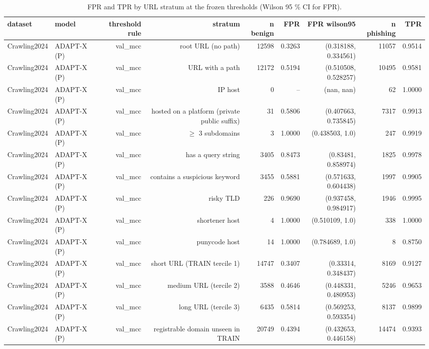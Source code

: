 \begin{table}[t]
\centering
\scriptsize
\caption{FPR and TPR by URL stratum at the frozen thresholds (Wilson 95 \% CI for FPR).}
\label{tab:rev_R7_fpr_tpr_by_url_stratum}
\begin{tabular}{llrrrrrrr}
\toprule
dataset & model & threshold rule & stratum & n benign & FPR & FPR wilson95 & n phishing & TPR \\
\midrule
Crawling2024 & ADAPT-X (P) & val\_mcc & root URL (no path) & 12598 & 0.3263 & (0.318188, 0.334561) & 11057 & 0.9514 \\
Crawling2024 & ADAPT-X (P) & val\_mcc & URL with a path & 12172 & 0.5194 & (0.510508, 0.528257) & 10495 & 0.9581 \\
Crawling2024 & ADAPT-X (P) & val\_mcc & IP host & 0 & -- & (nan, nan) & 62 & 1.0000 \\
Crawling2024 & ADAPT-X (P) & val\_mcc & hosted on a platform (private public suffix) & 31 & 0.5806 & (0.407663, 0.735845) & 7317 & 0.9913 \\
Crawling2024 & ADAPT-X (P) & val\_mcc & $\geq$ 3 subdomains & 3 & 1.0000 & (0.438503, 1.0) & 247 & 0.9919 \\
Crawling2024 & ADAPT-X (P) & val\_mcc & has a query string & 3405 & 0.8473 & (0.83481, 0.858974) & 1825 & 0.9978 \\
Crawling2024 & ADAPT-X (P) & val\_mcc & contains a suspicious keyword & 3455 & 0.5881 & (0.571633, 0.604438) & 1997 & 0.9905 \\
Crawling2024 & ADAPT-X (P) & val\_mcc & risky TLD & 226 & 0.9690 & (0.937458, 0.984917) & 1946 & 0.9995 \\
Crawling2024 & ADAPT-X (P) & val\_mcc & shortener host & 4 & 1.0000 & (0.510109, 1.0) & 338 & 1.0000 \\
Crawling2024 & ADAPT-X (P) & val\_mcc & punycode host & 14 & 1.0000 & (0.784689, 1.0) & 8 & 0.8750 \\
Crawling2024 & ADAPT-X (P) & val\_mcc & short URL (TRAIN tercile 1) & 14747 & 0.3407 & (0.33314, 0.348437) & 8169 & 0.9127 \\
Crawling2024 & ADAPT-X (P) & val\_mcc & medium URL (tercile 2) & 3588 & 0.4646 & (0.448331, 0.480953) & 5246 & 0.9653 \\
Crawling2024 & ADAPT-X (P) & val\_mcc & long URL (tercile 3) & 6435 & 0.5814 & (0.569253, 0.593354) & 8137 & 0.9899 \\
Crawling2024 & ADAPT-X (P) & val\_mcc & registrable domain unseen in TRAIN & 20749 & 0.4394 & (0.432653, 0.446158) & 14474 & 0.9393 \\

\end{tabular}
\end{table}
